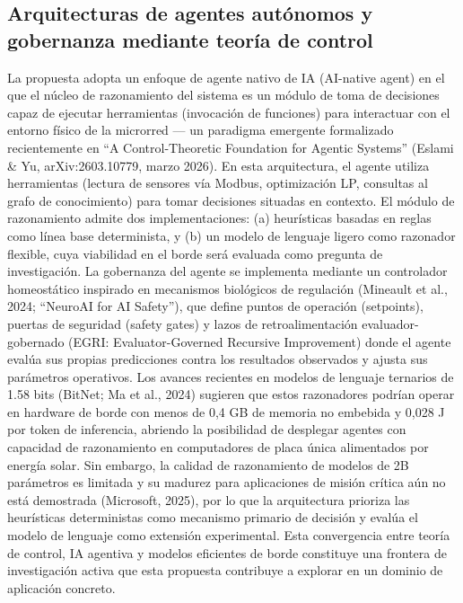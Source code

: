 \documentclass[12pt,letterpaper]{article}
\begin{document}
\subsection{Arquitecturas de agentes aut\'onomos y gobernanza mediante teor\'ia de control}

La propuesta adopta un enfoque de agente nativo de IA (AI-native agent) en el que el n\'ucleo de razonamiento del sistema es un m\'odulo de toma de decisiones capaz de ejecutar herramientas (invocaci\'on de funciones) para interactuar con el entorno f\'isico de la microrred --- un paradigma emergente formalizado recientemente en ``A Control-Theoretic Foundation for Agentic Systems'' (Eslami \& Yu, arXiv:2603.10779, marzo 2026). En esta arquitectura, el agente utiliza herramientas (lectura de sensores v\'ia Modbus, optimizaci\'on LP, consultas al grafo de conocimiento) para tomar decisiones situadas en contexto. El m\'odulo de razonamiento admite dos implementaciones: (a) heur\'isticas basadas en reglas como l\'inea base determinista, y (b) un modelo de lenguaje ligero como razonador flexible, cuya viabilidad en el borde ser\'a evaluada como pregunta de investigaci\'on. La gobernanza del agente se implementa mediante un controlador homeost\'atico inspirado en mecanismos biol\'ogicos de regulaci\'on (Mineault et al., 2024; ``NeuroAI for AI Safety''), que define puntos de operaci\'on (setpoints), puertas de seguridad (safety gates) y lazos de retroalimentaci\'on evaluador-gobernado (EGRI: Evaluator-Governed Recursive Improvement) donde el agente eval\'ua sus propias predicciones contra los resultados observados y ajusta sus par\'ametros operativos. Los avances recientes en modelos de lenguaje ternarios de 1.58 bits (BitNet; Ma et al., 2024) sugieren que estos razonadores podr\'ian operar en hardware de borde con menos de 0,4 GB de memoria no embebida y 0,028 J por token de inferencia, abriendo la posibilidad de desplegar agentes con capacidad de razonamiento en computadores de placa \'unica alimentados por energ\'ia solar. Sin embargo, la calidad de razonamiento de modelos de 2B par\'ametros es limitada y su madurez para aplicaciones de misi\'on cr\'itica a\'un no est\'a demostrada (Microsoft, 2025), por lo que la arquitectura prioriza las heur\'isticas deterministas como mecanismo primario de decisi\'on y eval\'ua el modelo de lenguaje como extensi\'on experimental. Esta convergencia entre teor\'ia de control, IA agentiva y modelos eficientes de borde constituye una frontera de investigaci\'on activa que esta propuesta contribuye a explorar en un dominio de aplicaci\'on concreto.
\end{document}
